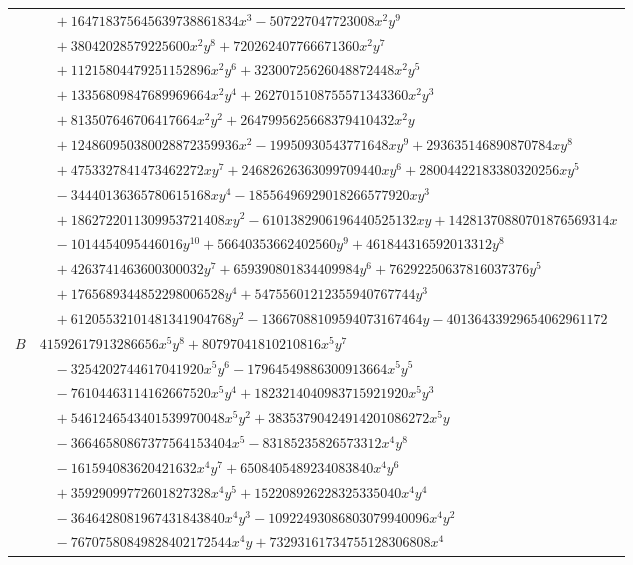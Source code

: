 \documentclass[11pt]{article}
\begin{document}
\begin{longtable}{@{}ll@{}}
 & $\quad +164718375645639738861834x^{3}-507227047723008x^{2}y^{9}$\\
 & $\quad +38042028579225600x^{2}y^{8}+720262407766671360x^{2}y^{7}$\\
 & $\quad +11215804479251152896x^{2}y^{6}+32300725626048872448x^{2}y^{5}$\\
 & $\quad +13356809847689969664x^{2}y^{4}+2627015108755571343360x^{2}y^{3}$\\
 & $\quad +813507646706417664x^{2}y^{2}+2647995625668379410432x^{2}y$\\
 & $\quad +124860950380028872359936x^{2}-19950930543771648xy^{9}+293635146890870784xy^{8}$\\
 & $\quad +4753327841473462272xy^{7}+24682626363099709440xy^{6}+28004422183380320256xy^{5}$\\
 & $\quad -34440136365780615168xy^{4}-18556496929018266577920xy^{3}$\\
 & $\quad +1862722011309953721408xy^{2}-6101382906196440525132xy+14281370880701876569314x$\\
 & $\quad -1014454095446016y^{10}+56640353662402560y^{9}+461844316592013312y^{8}$\\
 & $\quad +4263741463600300032y^{7}+659390801834409984y^{6}+76292250637816037376y^{5}$\\
 & $\quad +1765689344852298006528y^{4}+54755601212355940767744y^{3}$\\
 & $\quad +61205532101481341904768y^{2}-13667088109594073167464y-40136433929654062961172$\\
$B$ & $41592617913286656x^{5}y^{8}+80797041810210816x^{5}y^{7}$\\
 & $\quad -3254202744617041920x^{5}y^{6}-17964549886300913664x^{5}y^{5}$\\
 & $\quad -76104463114162667520x^{5}y^{4}+1823214040983715921920x^{5}y^{3}$\\
 & $\quad +5461246543401539970048x^{5}y^{2}+38353790424914201086272x^{5}y$\\
 & $\quad -36646580867377564153404x^{5}-83185235826573312x^{4}y^{8}$\\
 & $\quad -161594083620421632x^{4}y^{7}+6508405489234083840x^{4}y^{6}$\\
 & $\quad +35929099772601827328x^{4}y^{5}+152208926228325335040x^{4}y^{4}$\\
 & $\quad -3646428081967431843840x^{4}y^{3}-10922493086803079940096x^{4}y^{2}$\\
 & $\quad -76707580849828402172544x^{4}y+73293161734755128306808x^{4}$\\

\end{longtable}
\end{document}
